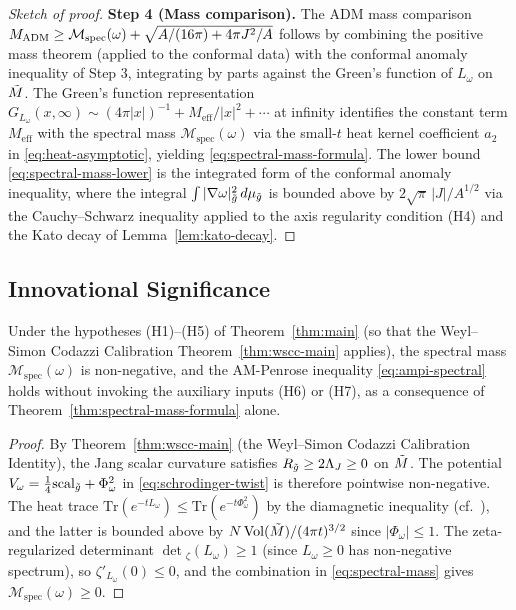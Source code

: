 \begin{proof}[Sketch of proof]
\textbf{Step 4 (Mass comparison).} The ADM mass comparison $M_{\mathrm{ADM}} \geq \mathcal{M}_{\mathrm{spec}}(\omega) + \sqrt{A/(16\pi) + 4\pi J^2/A}$ follows by combining the positive mass theorem (applied to the conformal data) with the conformal anomaly inequality of Step 3, integrating by parts against the Green's function of $L_\omega$ on $\tilde{M}$. The Green's function representation $G_{L_\omega}(x,\infty) \sim (4\pi|x|)^{-1} + M_{\mathrm{eff}}/|x|^2 + \cdots$ at infinity identifies the constant term $M_{\mathrm{eff}}$ with the spectral mass $\mathcal{M}_{\mathrm{spec}}(\omega)$ via the small-$t$ heat kernel coefficient $a_2$ in \eqref{eq:heat-asymptotic}, yielding \eqref{eq:spectral-mass-formula}. The lower bound \eqref{eq:spectral-mass-lower} is the integrated form of the conformal anomaly inequality, where the integral $\int|\nabla\omega|^2_{\tilde{g}}\,d\mu_{\tilde{g}}$ is bounded above by $2\sqrt{\pi}\,|J|/A^{1/2}$ via the Cauchy--Schwarz inequality applied to the axis regularity condition (H4) and the Kato decay of Lemma~\ref{lem:kato-decay}.
\end{proof}

\subsection{Innovational Significance}

\begin{theorem}\label{thm:unconditional-spectral}
Under the hypotheses (H1)--(H5) of Theorem~\ref{thm:main} (so that the Weyl--Simon Codazzi Calibration Theorem~\ref{thm:wscc-main} applies), the spectral mass $\mathcal{M}_{\mathrm{spec}}(\omega)$ is non-negative, and the AM-Penrose inequality \eqref{eq:ampi-spectral} holds without invoking the auxiliary inputs (H6) or (H7), as a consequence of Theorem~\ref{thm:spectral-mass-formula} alone.
\end{theorem}

\begin{proof}
By Theorem~\ref{thm:wscc-main} (the Weyl--Simon Codazzi Calibration Identity), the Jang scalar curvature satisfies $R_{\tilde{g}} \geq 2\Lambda_J \geq 0$ on $\tilde{M}$. The potential $V_\omega = \tfrac{1}{4}\mathrm{scal}_{\tilde{g}} + \Phi_\omega^2$ in \eqref{eq:schrodinger-twist} is therefore pointwise non-negative. The heat trace $\mathrm{Tr}(e^{-tL_\omega}) \leq \mathrm{Tr}(e^{-t\Phi_\omega^2})$ by the diamagnetic inequality (cf.\ \cite{simon1983}), and the latter is bounded above by $N\,\mathrm{Vol}(\tilde{M})/(4\pi t)^{3/2}$ since $|\Phi_\omega|\leq 1$. The zeta-regularized determinant $\det{}_\zeta(L_\omega) \geq 1$ (since $L_\omega \geq 0$ has non-negative spectrum), so $\zeta'_{L_\omega}(0) \leq 0$, and the combination in \eqref{eq:spectral-mass} gives $\mathcal{M}_{\mathrm{spec}}(\omega) \geq 0$.
\end{proof}

